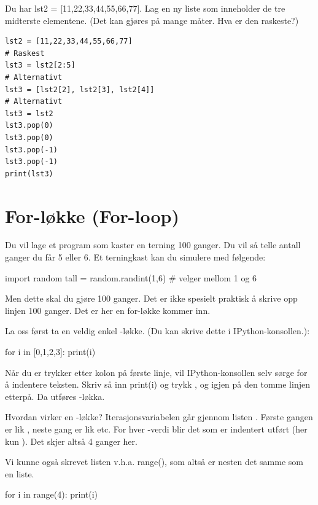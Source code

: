 \begin{exercise}
Du har lst2 = [11,22,33,44,55,66,77]. Lag en ny liste som inneholder de tre midterste elementene. (Det kan gjøres på mange måter. Hva er den raskeste?)
\end{exercise}
\begin{solution}
\begin{lstlisting}
lst2 = [11,22,33,44,55,66,77]
# Raskest
lst3 = lst2[2:5]
# Alternativt
lst3 = [lst2[2], lst2[3], lst2[4]]
# Alternativt
lst3 = lst2
lst3.pop(0)
lst3.pop(0)
lst3.pop(-1)
lst3.pop(-1)
print(lst3)
\end{lstlisting}
\end{solution}

\section{For-løkke (For-loop)}

Du vil lage et program som kaster en terning 100 ganger. Du vil så telle antall ganger du får 5 eller 6. Et terningkast kan du simulere med følgende:

\begin{usncodebox}
import random
tall = random.randint(1,6)   # velger mellom 1 og 6
\end{usncodebox}

Men dette skal du gjøre 100 ganger. Det er ikke spesielt praktisk å skrive opp linjen 100 ganger. Det er her en for-løkke kommer inn. 

La oss først ta en veldig enkel -løkke. (Du kan skrive dette i IPython-konsollen.):

\begin{usncodebox}
for i in [0,1,2,3]:
    print(i)
\end{usncodebox}

Når du er trykker  etter kolon på første linje, vil IPython-konsollen selv sørge for å indentere teksten. Skriv så inn print(i) og trykk , og  igjen på den tomme linjen etterpå. Da utføres -løkka.

Hvordan virker en -løkke? Iterasjonsvariabelen  går gjennom listen \usnvarvalue{[0,1,2,3]}. Første gangen er  lik , neste gang er  lik  etc. For hver -verdi blir det som er indentert utført (her kun ). Det skjer altså 4 ganger her.

Vi kunne også skrevet listen v.h.a. range(), som altså er nesten det samme som en liste.
\begin{usncodebox}
for i in range(4):
    print(i)
\end{usncodebox}

